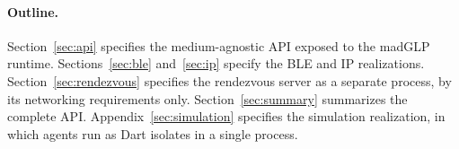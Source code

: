\paragraph{Outline.}
Section~\ref{sec:api} specifies the medium-agnostic API exposed to the madGLP runtime.  Sections~\ref{sec:ble} and~\ref{sec:ip} specify the BLE and IP realizations.  Section~\ref{sec:rendezvous} specifies the rendezvous server as a separate process, by its networking requirements only.  Section~\ref{sec:summary} summarizes the complete API.  Appendix~\ref{sec:simulation} specifies the simulation realization, in which agents run as Dart isolates in a single process.
